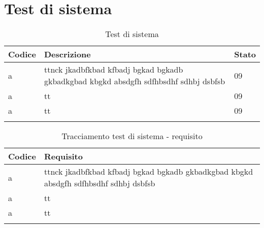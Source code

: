 \documentclass[PianoDiQualifica.tex]{subfiles}
\begin{document}
\chapter{Test di sistema}

\begin{longtable}[H]{P{2cm}P{8.5cm}P{3cm}}
	\color{CHeaderText}\textbf{Codice} & 
	\color{CHeaderText}\textbf{Descrizione} & 
	\color{CHeaderText}\textbf{Stato}\\
	\endhead
	a & ttnck  jkadbfkbad kfbadj bgkad bgkadb gkbadkgbad kbgkd absdgfh sdfhbsdhf sdhbj dsbfsb & 09 \\ 
	a & tt & 09 \\
	a & tt & 09 \\
	\hiderowcolors
	\caption{Test di sistema}
\end{longtable}

\begin{longtable}[H]{P{6.5cm}P{7cm}}
	\color{CHeaderText}\textbf{Codice} & 
	\color{CHeaderText}\textbf{Requisito} \\
	\endhead
	a & ttnck  jkadbfkbad kfbadj bgkad bgkadb gkbadkgbad kbgkd absdgfh sdfhbsdhf sdhbj dsbfsb \\ 
	a & tt  \\
	a & tt  \\
	\hiderowcolors
	\caption{Tracciamento test di sistema - requisito}
\end{longtable}
\end{document}
